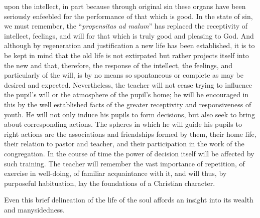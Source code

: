 upon the intellect, in part because through original sin these organs have been seriously enfeebled for the performance of that which is good. In the state of sin, we must remember, the “\emph{propensitas ad malum}” has replaced the receptivity of intellect, feelings, and will for that which is truly good and pleasing to God. And although by regeneration and justification a new life has been established, it is to be kept in mind that the old life is not extirpated but rather projects itself into the new and that, therefore, the response of the intellect, the feelings, and particularly of the will, is by no means so spontaneous or complete as may be desired and expected. Nevertheless, the teacher will not cease trying to influence the pupil’s will or the atmosphere of the pupil’s home; he will be encouraged in this by the well established facts of the greater receptivity and responsiveness of youth. He will not only induce his pupils to form decisions, but also seek to bring about corresponding actions. The spheres in which he will guide his pupils to right actions are the associations and friendships formed by them, their home life, their relation to pastor and teacher, and their participation in the work of the congregation. In the course of time the power of decision itself will be affected by such training. The teacher will remember the vast importance of repetition, of exercise in well-doing, of familiar acquaintance with it, and will thus, by purposeful habituation, lay the foundations of a Christian character.

Even this brief delineation of the life of the soul affords an insight into its wealth and manysidedness.

